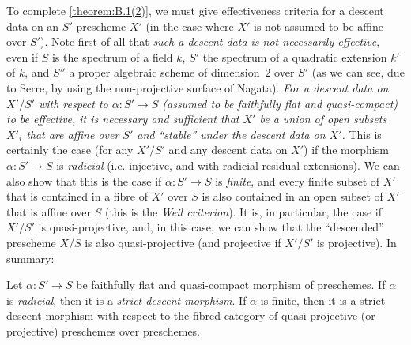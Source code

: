 \documentclass{article}
\theoremstyle{plain}
\newenvironment{theorem}[1]
  {\renewcommand\theinnercustomtheorem{#1}\innercustomtheorem}
  {\endinnercustomtheorem}
\theoremstyle{definition}
\newcommand{\oldpage}[1]{\marginpar{\footnotesize$\Big\vert$ \textit{p.~#1}}}
\begin{document}
To complete \cref{theorem:B.1(2)}, we must give effectiveness criteria for a descent data on an $S'$-prescheme $X'$ (in the case where $X'$ is not assumed to be affine over $S'$).
Note first of all that \emph{such a descent data is not necessarily effective}, even if $S$ is the spectrum of a field $k$, $S'$ the spectrum of a quadratic extension $k'$ of $k$, and $S''$ a proper algebraic scheme of dimension~$2$ over $S'$ (as we can see, due to Serre, by using the non-projective surface of Nagata).
\emph{For a descent data on $X'/S'$ with respect to $\alpha\colon S'\to S$ (assumed to be faithfully flat and quasi-compact) to be effective, it is necessary and sufficient that $X'$ be a union of open subsets $X'_i$ that are affine over $S'$ and ``stable'' under the descent data on $X'$.}
This is certainly the case (for any $X'/S'$ and any descent data on $X'$) if the morphism $\alpha\colon S'\to S$ is \emph{radicial} (i.e. injective, and with
\oldpage{190-20}
radicial residual extensions).
We can also show that this is the case if $\alpha\colon S'\to S$ is \emph{finite}, and every finite subset of $X'$ that is contained in a fibre of $X'$ over $S$ is also contained in an open subset of $X'$ that is affine over $S$ (this is the \emph{Weil criterion}).
It is, in particular, the case if $X'/S'$ is quasi-projective, and, in this case, we can show that the ``descended'' prescheme $X/S$ is also quasi-projective (and projective if $X'/S'$ is projective).
In summary:

\begin{theorem}{3}
\label{theorem:B.1(3)}
  Let $\alpha\colon S'\to S$ be faithfully flat and quasi-compact morphism of preschemes.
  If $\alpha$ is \emph{radicial}, then it is a \emph{strict descent morphism}.
  If $\alpha$ is finite, then it is a strict descent morphism with respect to the fibred category of quasi-projective (or projective) preschemes over preschemes.
\end{theorem}
\end{document}
